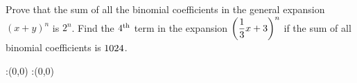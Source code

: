 



\question Prove that the sum of all the binomial coefficients in the general expansion $(x+y)^{n}$ is  $2^{n}$. Find the $4^{\text{th}}$ 
term in the expansion $\left(  \dfrac{1}{3} x + 3 \right) ^ n $ if the sum of all binomial coefficients is $1024$.


\watchout

\ifprintanswers
  \begin{marginfigure}
      :(0,0)
      :(0,0)
    \figdrawbegin{}
      \figdrawline [100,101]
    \figdrawend
    \figvisu{\figBoxA}{}{%
    }
    \centerline{\box\figBoxA}
  \end{marginfigure}
\fi 

